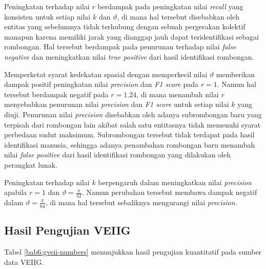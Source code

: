 Peningkatan terhadap nilai $r$ berdampak pada peningkatan nilai \textit{recall} yang konsisten untuk setiap nilai $k$ dan $\vartheta$, di mana hal tersebut disebabkan oleh entitas yang sebelumnya tidak terhubung dengan sebuah pergerakan kolektif manapun karena memiliki jarak yang dianggap jauh dapat teridentifikasi sebagai rombongan. Hal tersebut berdampak pada penurunan terhadap nilai \textit{false negative} dan meningkatkan nilai \textit{true positive} dari hasil identifikasi rombongan. 

Memperketat syarat kedekatan spasial dengan memperkecil nilai $\vartheta$ memberikan dampak positif peningkatan nilai \textit{precision} dan \textit{F1 score} pada $r = 1$. Namun hal tersebut berdampak negatif pada $r = 1.24$, di mana menambah nilai $r$ menyebabkan penurunan nilai \textit{precision} dan \textit{F1 score} untuk setiap nilai $k$ yang diuji. Penurunan nilai \textit{precision} disebabkan oleh adanya subrombongan baru yang terpisah dari rombongan lain akibat salah satu entitasnya tidak memenuhi syarat perbedaan sudut maksimum. Subrombongan tersebut tidak terdapat pada hasil identifikasi manusia, sehingga adanya penambahan rombongan baru menambah nilai \textit{false positive} dari hasil identifikasi rombongan yang dilakukan oleh perangkat lunak.

Peningkatan terhadap nilai $k$ berpengaruh dalam meningkatkan nilai \textit{precision} apabila $r = 1$ dan $\vartheta = \frac{\pi}{32}$. Namun perubahan tersebut membawa dampak negatif dalam $\vartheta = \frac{\pi}{64}$, di mana hal tersebut sebaliknya mengurangi nilai \textit{precision}.
 
\subsection{Hasil Pengujian VEIIG}
\label{subsec:veiig-result}

Tabel \ref{bab6:gveii-numbers} menunjukkan hasil pengujian kuantitatif pada sumber data VEIIG.

